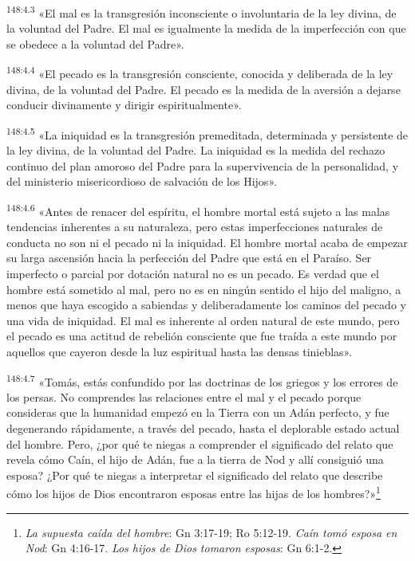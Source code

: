 \par 
\textsuperscript{148:4.3} «El mal es la transgresión inconsciente o involuntaria de la ley divina, de la voluntad del Padre. El mal es igualmente la medida de la imperfección con que se obedece a la voluntad del Padre».

\par 
\textsuperscript{148:4.4} «El pecado es la transgresión consciente, conocida y deliberada de la ley divina, de la voluntad del Padre. El pecado es la medida de la aversión a dejarse conducir divinamente y dirigir espiritualmente».

\par 
\textsuperscript{148:4.5} «La iniquidad es la transgresión premeditada, determinada y persistente de la ley divina, de la voluntad del Padre. La iniquidad es la medida del rechazo continuo del plan amoroso del Padre para la supervivencia de la personalidad, y del ministerio misericordioso de salvación de los Hijos».

\par 
\textsuperscript{148:4.6} «Antes de renacer del espíritu, el hombre mortal está sujeto a las malas tendencias inherentes a su naturaleza, pero estas imperfecciones naturales de conducta no son ni el pecado ni la iniquidad. El hombre mortal acaba de empezar su larga ascensión hacia la perfección del Padre que está en el Paraíso. Ser imperfecto o parcial por dotación natural no es un pecado. Es verdad que el hombre está sometido al mal, pero no es en ningún sentido el hijo del maligno, a menos que haya escogido a sabiendas y deliberadamente los caminos del pecado y una vida de iniquidad. El mal es inherente al orden natural de este mundo, pero el pecado es una actitud de rebelión consciente que fue traída a este mundo por aquellos que cayeron desde la luz espiritual hasta las densas tinieblas».

\par 
\textsuperscript{148:4.7} «Tomás, estás confundido por las doctrinas de los griegos y los errores de los persas. No comprendes las relaciones entre el mal y el pecado porque consideras que la humanidad empezó en la Tierra con un Adán perfecto, y fue degenerando rápidamente, a través del pecado, hasta el deplorable estado actual del hombre. Pero, ¿por qué te niegas a comprender el significado del relato que revela cómo Caín, el hijo de Adán, fue a la tierra de Nod y allí consiguió una esposa? ¿Por qué te niegas a interpretar el significado del relato que describe cómo los hijos de Dios encontraron esposas entre las hijas de los hombres?»\footnote{\textit{La supuesta caída del hombre}: Gn 3:17-19; Ro 5:12-19. \textit{Caín tomó esposa en Nod}: Gn 4:16-17. \textit{Los hijos de Dios tomaron esposas}: Gn 6:1-2.}

